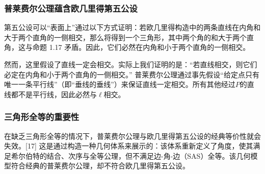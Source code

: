 \subsubsection{普莱费尔公理蕴含欧几里得第五公设}
第五公设可以“表面上”通过以下方式证明：若欧几里得构造中的两条直线在内角和大于两个直角的一侧相交，那么将得到一个三角形，其中两个角的和大于两个直角，这与命题 1.17 矛盾。因此，它们必然在内角和小于两个直角的一侧相交。

然而，这里假设了直线一定会相交。实际上我们证明的是：“若直线相交，则它们必定在内角和小于两个直角的一侧相交。” 普莱费尔公理通过事先假设“给定点只有唯一一条平行线”（即“垂线的垂线”）来保证直线一定相交。所有其他经过$P$的直线都不是平行线，因此必然与$\ell$相交。
\subsubsection{三角形全等的重要性}
在缺乏三角形全等的情况下，普莱费尔公理与欧几里得第五公设的经典等价性就会失效。[17] 这是通过构造一种几何体系来展示的：该体系重新定义了角度，使其满足希尔伯特的结合、次序与全等公理，但不满足边-角-边（SAS）全等。该几何模型符合经典的普莱费尔公理，却不符合欧几里得第五公设。
